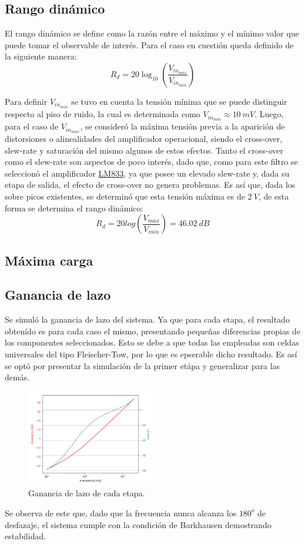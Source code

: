 \subsection{Rango dinámico}
El rango dinámico se define como la razón entre el máximo y el mínimo valor que puede tomar el observable de interés. Para el caso en cuestión queda definido de la siguiente manera:
\begin{equation}
	R_d = 20 \log_{10} \left( \frac{V_{in_{max}}}{V_{in_{min}}} \right)
\end{equation}

Para definir $V_{in_{min}}$ se tuvo en cuenta la tensión mínima que se puede distinguir respecto al piso de ruido, la cual es determinada como $V_{in_{min}} \approx 10 \ mV$. Luego, para el caso de $V_{in_{max}}$, se consideró la máxima tensión previa a la aparición de distorsiones o alinealidades del amplificador operacional, siendo el cross-over, slew-rate y saturación del mismo algunos de estos efectos. Tanto el cross-over como el slew-rate son aspectos de poco interés, dado que, como para este filtro se seleccionó el amplificador \href{http://www.ti.com/lit/ds/symlink/tl082.pdf}{LM833}, ya que posee un elevado slew-rate y, dada su etapa de salida, el efecto de cross-over no genera problemas. Es así que, dada los sobre picos existentes, se determinó que esta tensión máxima es de $2 \ V$, de esta forma se determina el rango dinámico:
\begin{equation}
	R_d = 20 log \left( \frac{V_{max}}{V_{min}} \right) = 46.02 \ dB 
\end{equation}

\subsection{Máxima carga}

\subsection{Ganancia de lazo}
Se simuló la ganancia de lazo del sistema. Ya que para cada etapa, el resultado obtenído es para cada caso el mismo, presentando pequeñas diferencias propias de los componentes seleccionados. Esto se debe a que todas las empleadas son celdas universales del tipo Fleischer-Tow, por lo que es epserable dicho resultado. Es así se optó por presentar la simulación de la primer etápa y generalizar para las demás.
\begin{figure}[H]
\centering
	\includegraphics[width=0.5\textwidth]{Imagenes/GananciaDeLazo.png}
	\caption{Ganancia de lazo de cada etapa.}
\label{fig:lazo}
\end{figure}

Se observa de este que, dado que la frecuencia nunca alcanza los $180^o$ de desfazaje, el sistema cumple con la condición de Barkhausen demostrando estabilidad.


